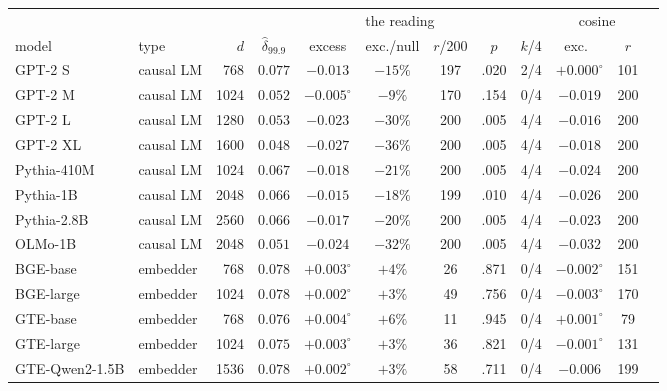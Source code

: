 \begin{table}[H]
\centering
\scriptsize
\setlength{\tabcolsep}{2.5pt}
\begingroup
\setlength{\tabcolsep}{3.5pt}
\begin{tabular}{llrccccccc|cc}
\toprule
 & & & \multicolumn{6}{c|}{the reading} & \multicolumn{2}{c}{cosine} \\
model & type & $d$ & $\hat\delta_{99.9}$ & excess & exc./null & $r$/200 & $p$ & $k$/4 & exc.\ & $r$ \\
\midrule
GPT-2 S & causal LM & 768 & $0.077$ & $-0.013$ & $-15\%$ & 197 & .020 & 2/4 & $+0.000^{\circ}$ & 101 \\
GPT-2 M & causal LM & 1024 & $0.052$ & $-0.005^{\circ}$ & $-9\%$ & 170 & .154 & 0/4 & $-0.019$ & 200 \\
GPT-2 L & causal LM & 1280 & $0.053$ & $-0.023$ & $-30\%$ & 200 & .005 & 4/4 & $-0.016$ & 200 \\
GPT-2 XL & causal LM & 1600 & $0.048$ & $-0.027$ & $-36\%$ & 200 & .005 & 4/4 & $-0.018$ & 200 \\
\midrule
Pythia-410M & causal LM & 1024 & $0.067$ & $-0.018$ & $-21\%$ & 200 & .005 & 4/4 & $-0.024$ & 200 \\
Pythia-1B & causal LM & 2048 & $0.066$ & $-0.015$ & $-18\%$ & 199 & .010 & 4/4 & $-0.026$ & 200 \\
Pythia-2.8B & causal LM & 2560 & $0.066$ & $-0.017$ & $-20\%$ & 200 & .005 & 4/4 & $-0.023$ & 200 \\
OLMo-1B & causal LM & 2048 & $0.051$ & $-0.024$ & $-32\%$ & 200 & .005 & 4/4 & $-0.032$ & 200 \\
\midrule
BGE-base & embedder & 768 & $0.078$ & $+0.003^{\circ}$ & $+4\%$ & 26 & .871 & 0/4 & $-0.002^{\circ}$ & 151 \\
BGE-large & embedder & 1024 & $0.078$ & $+0.002^{\circ}$ & $+3\%$ & 49 & .756 & 0/4 & $-0.003^{\circ}$ & 170 \\
GTE-base & embedder & 768 & $0.076$ & $+0.004^{\circ}$ & $+6\%$ & 11 & .945 & 0/4 & $+0.001^{\circ}$ & 79 \\
GTE-large & embedder & 1024 & $0.075$ & $+0.003^{\circ}$ & $+3\%$ & 36 & .821 & 0/4 & $-0.001^{\circ}$ & 131 \\
GTE-Qwen2-1.5B & embedder & 1536 & $0.078$ & $+0.002^{\circ}$ & $+3\%$ & 58 & .711 & 0/4 & $-0.006$ & 199 \\

\end{tabular}
\end{table}
